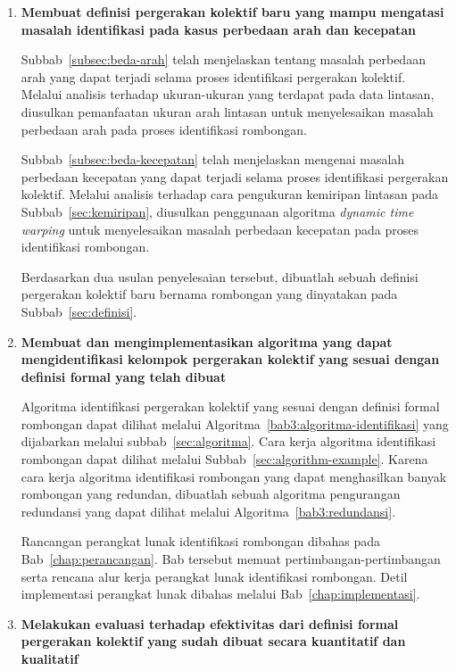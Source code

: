 \begin{enumerate}
    \item \textbf{Membuat definisi pergerakan kolektif baru yang mampu mengatasi masalah identifikasi pada kasus perbedaan arah dan kecepatan}
    
    Subbab~\ref{subsec:beda-arah} telah menjelaskan tentang masalah perbedaan arah yang dapat terjadi selama proses identifikasi pergerakan kolektif. Melalui analisis terhadap ukuran-ukuran yang terdapat pada data lintasan, diusulkan pemanfaatan ukuran arah lintasan untuk menyelesaikan masalah perbedaan arah pada proses identifikasi rombongan.
    
    Subbab~\ref{subsec:beda-kecepatan} telah menjelaskan mengenai masalah perbedaan kecepatan yang dapat terjadi selama proses identifikasi pergerakan kolektif. Melalui analisis terhadap cara pengukuran kemiripan lintasan pada Subbab~\ref{sec:kemiripan}, diusulkan penggunaan algoritma \textit{dynamic time warping} untuk menyelesaikan masalah perbedaan kecepatan pada proses identifikasi rombongan.
    
    Berdasarkan dua usulan penyelesaian tersebut, dibuatlah sebuah definisi pergerakan kolektif baru bernama rombongan yang dinyatakan pada Subbab~\ref{sec:definisi}.
    
    \item \textbf{Membuat dan mengimplementasikan algoritma yang dapat mengidentifikasi kelompok pergerakan kolektif yang sesuai dengan definisi formal yang telah dibuat}
    
    Algoritma identifikasi pergerakan kolektif yang sesuai dengan definisi formal rombongan dapat dilihat melalui Algoritma~\ref{bab3:algoritma-identifikasi} yang dijabarkan melalui subbab~\ref{sec:algoritma}. Cara kerja algoritma identifikasi rombongan dapat dilihat melalui Subbab~\ref{sec:algorithm-example}. Karena cara kerja algoritma identifikasi rombongan yang dapat menghasilkan banyak rombongan yang redundan, dibuatlah sebuah algoritma pengurangan redundansi yang dapat dilihat melalui Algoritma~\ref{bab3:redundansi}.
    
    Rancangan perangkat lunak identifikasi rombongan dibahas pada Bab~\ref{chap:perancangan}. Bab tersebut memuat pertimbangan-pertimbangan serta rencana alur kerja perangkat lunak identifikasi rombongan. Detil implementasi perangkat lunak dibahas melalui Bab~\ref{chap:implementasi}.
    
    \item \textbf{Melakukan evaluasi terhadap efektivitas dari definisi formal pergerakan kolektif yang sudah dibuat secara kuantitatif dan kualitatif}
    

\end{enumerate}
